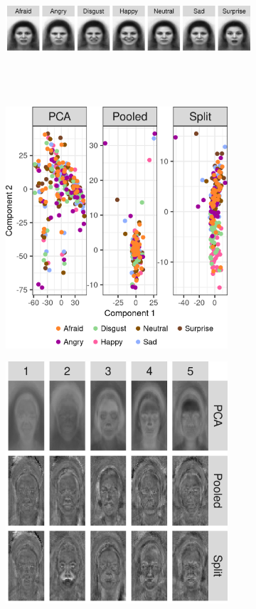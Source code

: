 \documentclass[12pt]{article}
\begin{document}
\begin{figure}
    \begin{subfigure}{\linewidth}
    \centering
    \includegraphics[height=3.0cm,width=\textwidth]{figure/mean_emotions.png}
    \caption{}
    \label{fig:faces-mean}
    \end{subfigure}\\[1ex]
    \begin{subfigure}{.49\linewidth}
    \centering
    \includegraphics[height = 9.0cm,width=\textwidth]{figure/Afraid_projected_1_2_removed.png}
    \caption{}
    \label{fig:faces-projected}
    \end{subfigure}
    \begin{subfigure}{.49\linewidth}
    \centering
    \includegraphics[height = 9.0cm,width=\textwidth]{figure/all_Afraid_removed.png}

\end{subfigure}
\end{figure}
\end{document}
